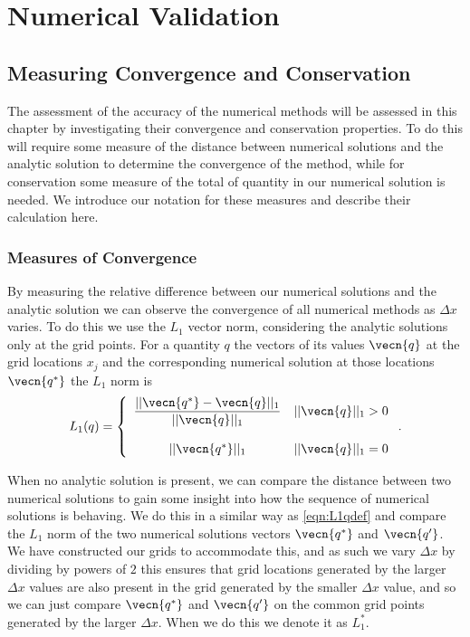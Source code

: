 
\chapter{Numerical Validation}
\label{chp:NumMethodComp}

\section{Measuring Convergence and Conservation}
The assessment of the accuracy of the numerical methods will be assessed in this chapter by investigating their convergence and conservation properties. To do this will require some measure of the distance between numerical solutions and the analytic solution to determine the convergence of the method, while for conservation some measure of the total of quantity in our numerical solution is needed. We introduce our notation for these measures and describe their calculation here.

\subsection{Measures of Convergence}
By measuring the relative difference between our numerical solutions and the analytic solution we can observe the convergence of all numerical methods as $\Delta x$ varies. To do this we use the $L_1$ vector norm, considering the analytic solutions only at the grid points. For a quantity $q$ the vectors of its values $\vecn{q}$ at the grid locations $x_j$ and the corresponding numerical solution at those locations $\vecn{q^*}$ the $L_1$ norm is
\begin{equation}
L_1(q) =  \left\lbrace \begin{array}{c r} 
\dfrac{||\vecn{q^*} - \vecn{q}||_{1}}{||\vecn{q}||_{1}} & ||\vecn{q}||_{1} > 0 \\ \\
{||\vecn{q^*}||_{1}} & ||\vecn{q}||_{1} = 0  \end{array}\right. . 
\label{eqn:L1qdef} 
\end{equation}

When no analytic solution is present, we can compare the distance between two numerical solutions to gain some insight into how the sequence of numerical solutions is behaving. We do this in a similar way as \eqref{eqn:L1qdef} and compare the $L_1$ norm of the two numerical solutions vectors $\vecn{q^*}$ and $\vecn{q'}$. We have constructed our grids to accommodate this, and as such we vary $\Delta x$ by dividing by powers of $2$ this ensures that grid locations generated by the larger $\Delta x$ values are also present in the grid generated by the smaller $\Delta x$ value, and so we can just compare $\vecn{q^*}$ and $\vecn{q'}$ on the common grid points generated by the larger $\Delta x$. When we do this we denote it as $L^*_1$.


